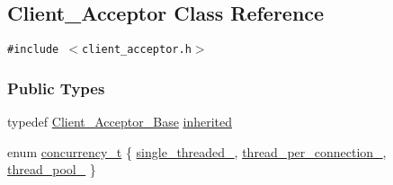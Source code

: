 \hypertarget{classClient__Acceptor}{
\subsection{Client\_\-Acceptor Class Reference}
\label{classClient__Acceptor}
}
{\tt \#include $<$client\_\-acceptor.h$>$}

\subsubsection*{Public Types}
\begin{CompactItemize}
\item 
typedef \hyperlink{client__acceptor_8h_a0}{Client\_\-Acceptor\_\-Base} \hyperlink{classClient__Acceptor_Client__Acceptors0}{inherited}
\item 
enum \hyperlink{classClient__Acceptor_Client__Acceptors4}{concurrency\_\-t} \{ \hyperlink{classClient__Acceptor_Client__Acceptors4Client__Acceptors1}{single\_\-threaded\_\-}, 
\hyperlink{classClient__Acceptor_Client__Acceptors4Client__Acceptors2}{thread\_\-per\_\-connection\_\-}, 
\hyperlink{classClient__Acceptor_Client__Acceptors4Client__Acceptors3}{thread\_\-pool\_\-}
 \}
\end{CompactItemize}
